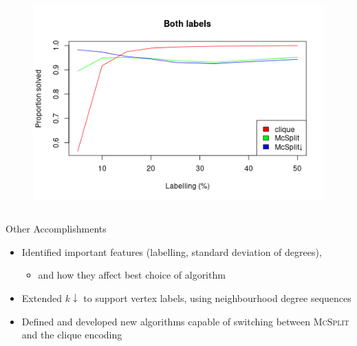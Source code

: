 \documentclass{beamer}
\begin{document}
\begin{frame}
\begin{columns}
\begin{column}{0.5\textwidth}
\begin{figure}
        \includegraphics[width=\textwidth]{../dissertation/images/both_labels_linechart.png}
      \end{figure}
    \end{column}
  \end{columns}
\end{frame}

\begin{frame}{Other Accomplishments}
  \begin{itemize}
  \item Identified important features (labelling, standard deviation of degrees),
    \begin{itemize}
    \item and how they affect best choice of algorithm
    \end{itemize}
  \item Extended $k{\downarrow}$ to support vertex labels, using neighbourhood
    degree sequences
  \item Defined and developed new algorithms capable of switching between
    \textsc{McSplit} and the clique encoding
  \end{itemize}
\end{frame}
\end{document}
